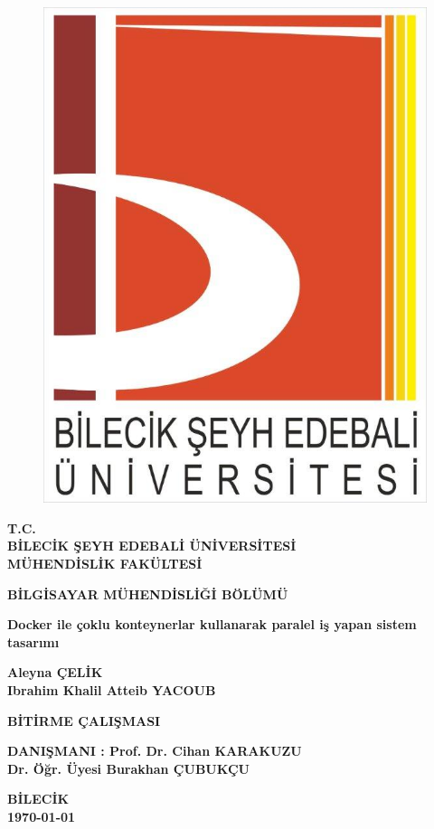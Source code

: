 \thispagestyle{empty}
\begin{figure}[H]
\centering
\includegraphics[scale=0.2]{logomuz}
\end{figure}

\begin{center}
\textbf{T.C.}\\
\textbf{BİLECİK ŞEYH EDEBALİ ÜNİVERSİTESİ}\\
\textbf{MÜHENDİSLİK FAKÜLTESİ}

\textbf{BİLGİSAYAR MÜHENDİSLİĞİ BÖLÜMÜ}
\end{center}
\vfill
\begin{center}
\textbf{Docker ile çoklu konteynerlar kullanarak paralel iş yapan sistem tasarımı }

\textbf{Aleyna ÇELİK \\ Ibrahim Khalil Atteib YACOUB}

\textbf{BİTİRME ÇALIŞMASI}
\end{center}
\vfill
\begin{center}
\textbf{DANIŞMANI : Prof. Dr. Cihan KARAKUZU \\ Dr. Öğr. Üyesi Burakhan ÇUBUKÇU}

\textbf{BİLECİK}\\ 
\textbf{\today}
\end{center}

